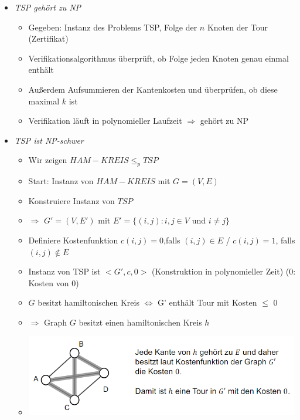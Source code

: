 \documentclass[
    12pt,
    a4paper,
    ngerman,
    color=3b,%
    marginpar=false,
    colorback=false,
    leqno,
]{tudaexercise}
\begin{document}
\begin{itemize}
\begin{itemize}
              \item \textit{TSP gehört zu NP}
                    \begin{itemize}
                        \item Gegeben: Instanz des Problems TSP, Folge der $n$ Knoten der Tour (Zertifikat)
                        \item Verifikationsalgorithmus überprüft, ob Folge jeden Knoten genau einmal enthält
                        \item Außerdem Aufsummieren der Kantenkosten und überprüfen, ob diese maximal $k$ ist
                        \item Verifikation läuft in polynomieller Laufzeit $\Rightarrow$ gehört zu NP
                    \end{itemize}
                    \clearpage
              \item \textit{TSP ist NP-schwer}
                    \begin{itemize}
                        \item Wir zeigen $HAM-KREIS \leq_p TSP$
                        \item Start: Instanz von $HAM-KREIS$ mit $G=(V,E)$
                        \item Konstruiere Instanz von $TSP$
                        \item[] $\Rightarrow$ $G'=(V,E')$ mit $E'=\{(i,j):i,j \in V$ und $i\neq j\}$
                        \item Definiere Kostenfunktion $c(i,j) = 0$,falls $(i,j) \in E$ / $c(i,j)=1$, falls $(i,j) \notin E$
                        \item Instanz von TSP ist $<G', c, 0>$ (Konstruktion in polynomieller Zeit) (0: Kosten von 0)
                        \item {} $G$ besitzt hamiltonischen Kreis $\Leftrightarrow$ G' enthält Tour mit Kosten $\leq$ 0
                        \item $\Rightarrow$ Graph $G$ besitzt einen hamiltonischen Kreis $h$
                        \item[] \includegraphics[width=12cm]{pictures/schwer1.PNG}

\end{itemize}
\end{itemize}
\end{itemize}
\end{document}

